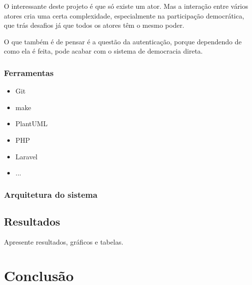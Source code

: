 \documentclass[12pt,a4paper,openright,oneside]{memoir}
\begin{document}
O interessante deste projeto é que só existe um ator. Mas a interação entre
vários atores cria uma certa complexidade, especialmente na participação
democrática, que trás desafios já que todos os atores têm o mesmo poder.

O que também é de pensar é a questão da autenticação, porque dependendo de como
ela é feita, pode acabar com o sistema de democracia direta.

\subsection{Ferramentas}

\begin{itemize}
  \item Git
  \item make
  \item PlantUML
  \item PHP
  \item Laravel
  \item ...
\end{itemize}

\subsection{Arquitetura do sistema}

\section{Resultados}
Apresente resultados, gráficos e tabelas.


\chapter{Conclusão}
\label{ch:conclusion}
\end{document}
